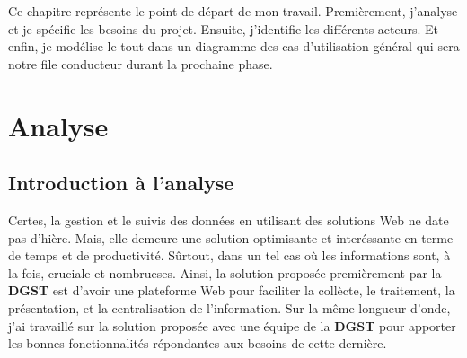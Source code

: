 \documentclass[a4paper]{report}
\begin{document}
\begin{doublespace}
\begin{doublespace}
        Ce chapitre représente le point de départ de mon travail. Premièrement, j'analyse et
        je spécifie les besoins du projet. Ensuite, j'identifie les différents acteurs. Et enfin, je
        modélise le tout dans un diagramme des cas d’utilisation général qui sera notre file conducteur
        durant la prochaine phase.
        \section{Analyse}
        \subsection{Introduction à l'analyse}
        Certes, la gestion et le suivis des données en utilisant des solutions Web ne date pas d'hière. Mais,
        elle demeure une solution optimisante et interéssante en terme de temps et de productivité. Sûrtout,
        dans un tel cas où les informations sont, à la fois, cruciale et nombrueses. Ainsi, la solution
        proposée premièrement par la \textbf{DGST} est d'avoir une plateforme Web pour faciliter la collècte,
        le traitement, la présentation, et la centralisation de l'information. Sur la même longueur d'onde, j'ai
        travaillé sur la solution proposée avec une équipe de la \textbf{DGST} pour apporter les bonnes
        fonctionnalités répondantes aux besoins de cette dernière.

\end{doublespace}
\end{doublespace}
\end{document}
